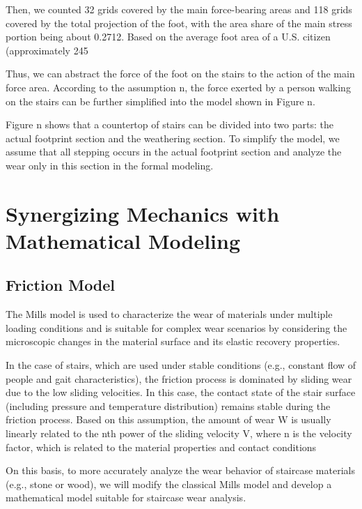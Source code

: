\documentclass{mcmthesis}
\begin{document}
Then, we counted 32 grids covered by the main force-bearing areas and 118 grids covered by the total projection of the foot, with the area share of the main stress portion being about 0.2712. Based on the average foot area of a U.S. citizen (approximately 245 %

Thus, we can abstract the force of the foot on the stairs to the action of the main force area. According to the assumption n, the force exerted by a person walking on the stairs can be further simplified into the model shown in Figure n.

Figure n shows that a countertop of stairs can be divided into two parts: the actual footprint section and the weathering section. To simplify the model, we assume that all stepping occurs in the actual footprint section and analyze the wear only in this section in the formal modeling.
\section{Synergizing Mechanics with Mathematical Modeling}
\subsection{Friction Model}
The Mills model is used to characterize the wear of materials under multiple loading conditions and is suitable for complex wear scenarios by considering the microscopic changes in the material surface and its elastic recovery properties.

In the case of stairs, which are used under stable conditions (e.g., constant flow of people and gait characteristics), the friction process is dominated by sliding wear due to the low sliding velocities. In this case, the contact state of the stair surface (including pressure and temperature distribution) remains stable during the friction process. Based on this assumption, the amount of wear W is usually linearly related to the nth power of the sliding velocity V, where n is the velocity factor, which is related to the material properties and contact conditions%

On this basis, to more accurately analyze the wear behavior of staircase materials (e.g., stone or wood), we will modify the classical Mills model and develop a mathematical model suitable for staircase wear analysis.
\end{document}
